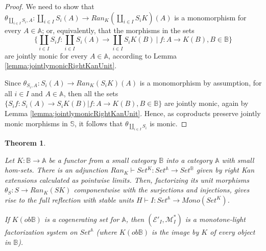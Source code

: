 \documentclass[12pt,a4paper]{amsart}
\newtheorem{theorem}{Theorem}[section]
\theoremstyle{definition}
\begin{document}
\begin{proof}
We need to show that $\theta_{\coprod_{i\in I}S_i,A}:\coprod_{i\in I}S_i(A)\rightarrow Ran_K(\coprod_{i\in I}S_iK)(A)$ is a monomorphism for every $A\in\mathbb{A}$; or, equivalently, that the morphisms in the sets $$\{\coprod_{i\in I}S_if:\coprod_{i\in I}S_i(A)\rightarrow \coprod_{i\in I}S_iK(B)\ |\ f:A\rightarrow K(B),B\in\mathbb{B}\}$$ \noindent are jointly monic for every $A\in \mathbb{A}$, according to Lemma \ref{lemma:jointlymonicRightKanUnit}.

Since $\theta_{S_i,A}:S_i(A)\rightarrow Ran_K(S_iK)(A)$ is a monomorphism by assumption, for all $i\in I$ and $A\in \mathbb{A}$, then all the sets $\{S_if:S_i(A)\rightarrow S_iK(B)|f:A\rightarrow K(B),B\in\mathbb{B}\}$ are jointly monic, again by Lemma \ref{lemma:jointlymonicRightKanUnit}. Hence, as coproducts preserve jointly monic morphisms in $\mathbb{S}$, it follows that $\theta_{\coprod_{i\in I}S_i}$ is monic.\end{proof}


\begin{theorem}\label{theorem:RightKanCogeneratingVeryWellBehaved}

Let $K:\mathbb{B}\rightarrow\mathbb{A}$ be a functor from a small category $\mathbb{B}$ into a category $\mathbb{A}$ with small hom-sets. There is an adjunction $Ran_K\vdash Set^K:Set^\mathbb{A}\rightarrow Set^\mathbb{B}$ given by right Kan extensions calculated as pointwise limits. Then, factorizing its unit morphisms $\theta_S:S\rightarrow Ran_K(SK)$ componentwise with the surjections and injections, gives rise to the full reflection with stable units $H\vdash I:Set^\mathbb{A}\rightarrow Mono(Set^K)$.

If $K(ob\mathbb{B})$ is a cogenerating set for $\mathbb{A}$, then $(\mathcal{E}'_I,\mathcal{M}^*_I)$ is a monotone-light factorization system on $Set^\mathbb{A}$ (where $K(ob\mathbb{B})$ is the image by $K$ of every object in $\mathbb{B}$).
\end{theorem}
\end{document}
